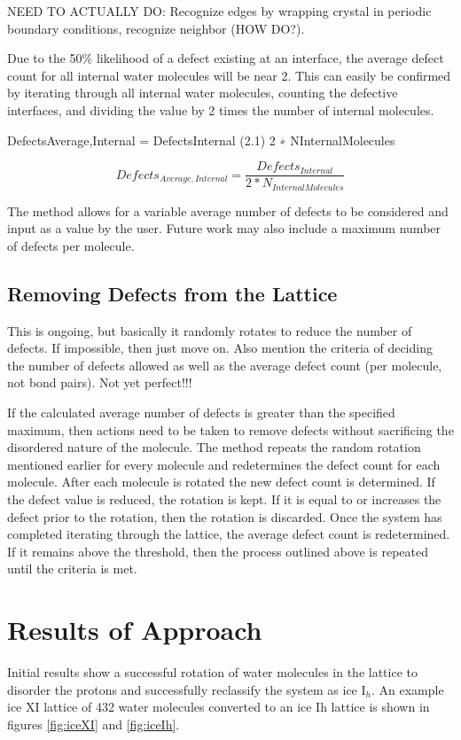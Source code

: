 NEED TO ACTUALLY DO: Recognize edges by wrapping crystal in periodic boundary conditions, recognize neighbor (HOW DO?).

Due to the 50\% likelihood of a defect existing at an interface, the average defect count for all internal water molecules will be near 2. 
This can easily be confirmed by iterating through all internal water molecules, counting the defective interfaces, and dividing the value by 2 times the number of internal molecules.

DefectsAverage,Internal = DefectsInternal (2.1) 2 ∗ NInternalMolecules

\begin{equation}
Defects_{Average, Internal} = \frac{Defects_{Internal}}{2*N_{Internal Molecules}}
\end{equation}

The method allows for a variable average number of defects to be considered and input as a value by the user. Future work may also include a maximum number of defects per molecule.

\subsection{Removing Defects from the Lattice}
This is ongoing, but basically it randomly rotates to reduce the number of defects. 
If impossible, then just move on. 
Also mention the criteria of deciding the number of defects allowed as well as the average defect count (per molecule, not bond pairs). 
Not yet perfect!!!

If the calculated average number of defects is greater than the specified maximum, then actions need to be taken to remove defects without sacrificing the disordered nature of the molecule. 
The method repeats the random rotation mentioned earlier for every molecule and redetermines the defect count for each molecule. 
After each molecule is rotated the new defect count is determined. 
If the defect value is reduced, the rotation is kept. 
If it is equal to or increases the defect prior to the rotation, then the rotation is discarded. 
Once the system has completed iterating through the lattice, the average defect count is redetermined. 
If it remains above the threshold, then the process outlined above is repeated until the criteria is met.

\section{Results of Approach}
Initial results show a successful rotation of water molecules in the lattice to disorder the protons and successfully reclassify the system as ice I$_{h}$. 
An example ice XI lattice of 432 water molecules converted to an ice Ih lattice is shown in figures \ref{fig:iceXI} and \ref{fig:iceIh}.

